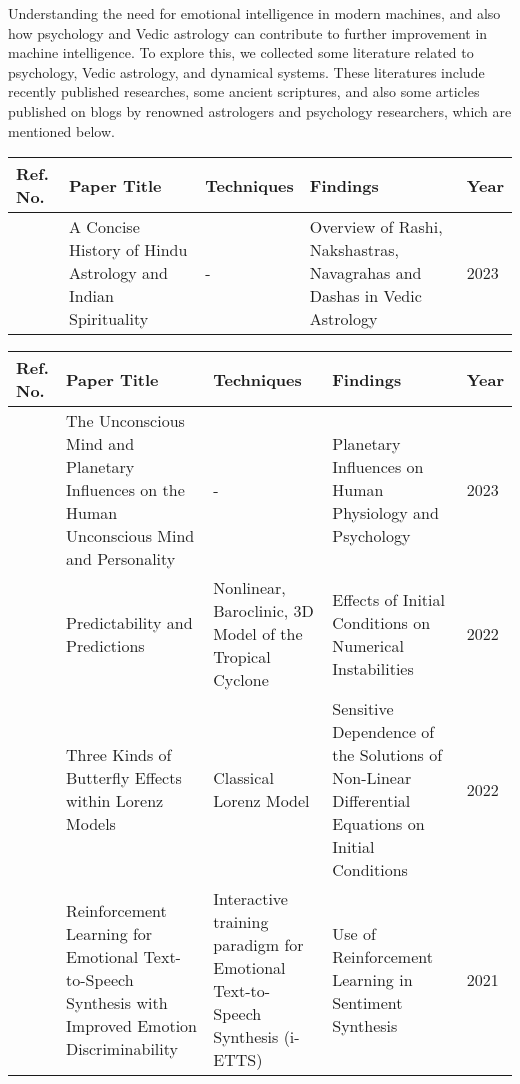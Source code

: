 Understanding the need for emotional intelligence in modern machines, and also how psychology and Vedic astrology can contribute to further improvement in machine intelligence. To explore this, we collected some literature related to psychology, Vedic astrology, and dynamical systems. These literatures include recently published researches, some ancient scriptures, and also some articles published on blogs by renowned astrologers and psychology researchers, which are mentioned below.
\vspace{1\baselineskip}

\noindent
\begin{tabularx}{\columnwidth}{|M|M|M|M|M|}
	\hline
	\textbf{Ref. No.} & \textbf{Paper Title} & \textbf{Techniques} & \textbf{Findings} & \textbf{Year}\\
	\hline
	\cite{article2} & A Concise History of Hindu Astrology and Indian Spirituality & - & Overview of Rashi, Nakshastras, Navagrahas and Dashas in Vedic Astrology & 2023\\
	\hline
\end{tabularx}

\noindent
\begin{tabularx}{\columnwidth}{|M|M|M|M|M|}
	\hline
	\textbf{Ref. No.} & \textbf{Paper Title} & \textbf{Techniques} & \textbf{Findings} & \textbf{Year}\\
	\hline
	\cite{article1} & The Unconscious Mind and Planetary Influences on the Human Unconscious Mind and Personality & - & Planetary Influences on Human Physiology and Psychology & 2023\\
	\hline
	\cite{atmos13081292} & Predictability and Predictions & Nonlinear, Baroclinic, 3D Model of the Tropical Cyclone & Effects of Initial Conditions on Numerical Instabilities & 2022\\
	\hline
	\cite{encyclopedia2030084} & Three Kinds of Butterfly Effects within Lorenz Models & Classical Lorenz Model & Sensitive Dependence of the Solutions of Non-Linear Differential Equations on Initial Conditions & 2022\\
	\hline
	\cite{liu21p_interspeech} & Reinforcement Learning for Emotional Text-to-Speech Synthesis with Improved Emotion Discriminability & Interactive training paradigm for Emotional Text-to-Speech Synthesis (i-ETTS) & Use of Reinforcement Learning in Sentiment Synthesis & 2021\\
	\hline
\end{tabularx}

